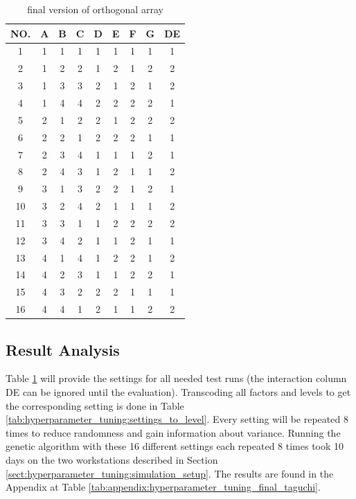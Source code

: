 \begin{table}[ht]
	\centering
	\begin{tabular}{ |c||c|c|c|c|c|c|c|c|  }
		\hline
		NO.& A & B & C & D & E & F & G & DE\\
		\hline
		1  & 1 & 1 & 1 & 1 & 1 & 1 & 1 & 1\\
		2  & 1 & 2 & 2 & 1 & 2 & 1 & 2 & 2\\
		3  & 1 & 3 & 3 & 2 & 1 & 2 & 1 & 2\\
		4  & 1 & 4 & 4 & 2 & 2 & 2 & 2 & 1\\
		5  & 2 & 1 & 2 & 2 & 1 & 2 & 2 & 2\\
		6  & 2 & 2 & 1 & 2 & 2 & 2 & 1 & 1\\
		7  & 2 & 3 & 4 & 1 & 1 & 1 & 2 & 1\\
		8  & 2 & 4 & 3 & 1 & 2 & 1 & 1 & 2\\
		9  & 3 & 1 & 3 & 2 & 2 & 1 & 2 & 1\\
		10 & 3 & 2 & 4 & 2 & 1 & 1 & 1 & 2\\
		11 & 3 & 3 & 1 & 1 & 2 & 2 & 2 & 2\\
		12 & 3 & 4 & 2 & 1 & 1 & 2 & 1 & 1\\
		13 & 4 & 1 & 4 & 1 & 2 & 2 & 1 & 2\\
		14 & 4 & 2 & 3 & 1 & 1 & 2 & 2 & 1\\
		15 & 4 & 3 & 2 & 2 & 2 & 1 & 1 & 1\\
		16 & 4 & 4 & 1 & 2 & 1 & 1 & 2 & 2\\
		\hline
	\end{tabular}
	\caption{final version of orthogonal array}
	\label{tab:hyperparameter_tuning:final_taguchi}
\end{table}


\subsection{Result Analysis}
\label{sect:hyperparameter_tuning:analysis_of_results}
Table \ref{tab:hyperparameter_tuning:final_taguchi} will provide the settings for all needed test runs (the interaction column DE can be ignored until the evaluation). Transcoding all factors and levels to get the corresponding setting is done in Table \ref{tab:hyperparameter_tuning:settings_to_level}. Every setting will be repeated 8 times to reduce randomness and gain information about variance. Running the genetic algorithm with these 16 different settings each repeated 8 times took 10 days on the two workstations described in Section \ref{sect:hyperparameter_tuning:simulation_setup}. The results are found in the Appendix at Table \ref{tab:appendix:hyperparameter_tuning_final_taguchi}.

